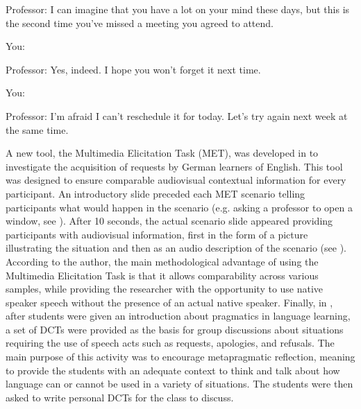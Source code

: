 \documentclass[output=paper]{LSP/langsci}
\begin{document}
Professor: I can imagine that you have a lot on your mind these days, but this is the second time you’ve missed a meeting you agreed to attend.


You: {\longrule}{\longrule}{\longrule}{\longrule}{\longrule}{\longrule}{\longrule}{\longrule}{\longrule}{\longrule}{\longrule}{\longrule}{\longrule}{\longrule}{\longrule}{\longrule}


Professor: Yes, indeed. I hope you won’t forget it next time.  


You: {\longrule}{\longrule}{\longrule}{\longrule}{\longrule}{\longrule}{\longrule}{\longrule}{\longrule}{\longrule}{\longrule}{\longrule}{\longrule}{\longrule}{\longrule}{\longrule}

Professor: I’m afraid I can’t reschedule it for today. Let’s try again next week at the same time.
    \z


A new tool, the Multimedia Elicitation Task (MET), was developed in \citet{Schauer2004} to investigate the acquisition of requests by German learners of English. This tool was designed to ensure comparable audiovisual contextual information for every participant. An introductory slide preceded each MET scenario telling par\-ti\-ci\-pants what would happen in the scenario (e.g. asking a professor to open a window, see ). After 10 seconds, the actual scenario slide appeared providing par\-ti\-ci\-pants with audiovisual information, first in the form of a picture illustrating the situation and then as an audio description of the scenario (see ). According to the author, the main methodological advantage of using the Multimedia Elicitation Task is that it allows comparability across various samples, while providing the researcher with the opportunity to use native speaker speech without the presence of an actual native speaker. Finally, in \citet{McLean2005}, after students were given an introduction about pragmatics in language learning, a set of DCTs were provided as the basis for group discussions about situations requiring the use of speech acts such as requests, apologies, and refusals. The main purpose of this activity was to encourage metapragmatic reflection, meaning to provide the students with an adequate context to think and talk about how language can or cannot be used in a variety of situations. The students were then asked to write personal DCTs for the class to discuss. 
\end{document}
